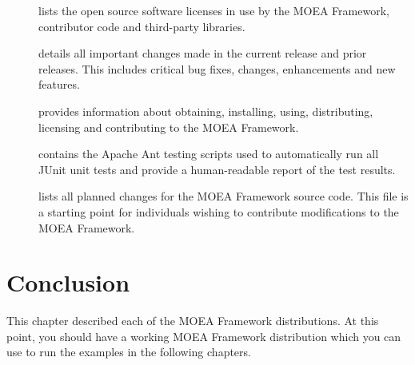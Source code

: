 \begin{description}
  \item[] lists the open source software licenses in use by the MOEA Framework, contributor code and third-party libraries.
  \item[] details all important changes made in the current release and prior releases.  This includes critical bug fixes, changes, enhancements and new features.
  \item[] provides information about obtaining, installing, using, distributing, licensing and contributing to the MOEA Framework.
  \item[] contains the Apache Ant testing scripts used to automatically run all JUnit unit tests and provide a human-readable report of the test results.
  \item[] lists all planned changes for the MOEA Framework source code.  This file is a starting point for individuals wishing to contribute modifications to the MOEA Framework.
\end{description}

\section{Conclusion}
This chapter described each of the MOEA Framework distributions.  At this point, you should have a working MOEA Framework distribution which you can use to run the examples in the following chapters.